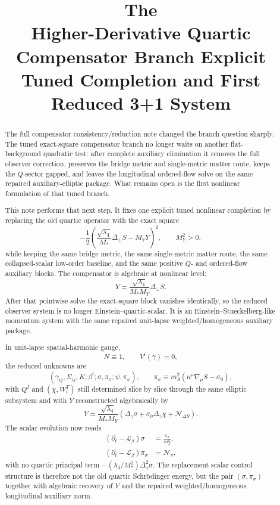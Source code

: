 \documentclass[11pt]{article}
\title{\textbf{The \TheoryName{}}\\[0.4em]
\large Higher-Derivative Quartic Compensator Branch Explicit Tuned Completion and First Reduced 3+1 System}
\author{}
\date{}
\newcommand{\Ell}{\mathcal{L}}
\begin{document}
\maketitle

\begin{abstract}
The full compensator consistency/reduction note changed the branch question sharply. The tuned exact-square compensator branch no longer waits on another flat-background quadratic test: after complete auxiliary elimination it removes the full observer correction, preserves the bridge metric and single-metric matter route, keeps the \(Q\)-sector gapped, and leaves the longitudinal ordered-flow solve on the same repaired auxiliary-elliptic package. What remains open is the first nonlinear formulation of that tuned branch.

This note performs that next step. It fixes one explicit tuned nonlinear completion by replacing the old quartic operator with the exact square
\[
-\frac12
\left(
\frac{\sqrt{\lambda_4}}{M_*}\Delta_\perp S
- M_Y Y
\right)^2,
\qquad
M_Y^2>0,
\]
while keeping the same bridge metric, the same single-metric matter route, the same collapsed-scalar low-order baseline, and the same positive \(Q\)- and ordered-flow auxiliary blocks. The compensator is algebraic at nonlinear level:
\[
Y
=
\frac{\sqrt{\lambda_4}}{M_*M_Y}\Delta_\perp S.
\]
After that pointwise solve the exact-square block vanishes identically, so the reduced observer system is no longer Einstein--quartic-scalar. It is an Einstein--Stueckelberg-like momentum system with the same repaired unit-lapse weighted/homogeneous auxiliary package.

In unit-lapse spatial-harmonic gauge,
\[
N\equiv 1,
\qquad
V^i(\gamma)=0,
\]
the reduced unknowns are
\[
(\gamma_{ij},\Sigma_{ij},K;\beta^i;\sigma,\pi_\sigma;\psi,\pi_\psi),
\qquad
\pi_\sigma \equiv m_S^2(n^\mu\nabla_\mu S-\sigma_0),
\]
with \(Q^I\) and \((\chi,W_i^T)\) still determined slice by slice through the same elliptic subsystem and with \(Y\) reconstructed algebraically by
\[
Y
=
\frac{\sqrt{\lambda_4}}{M_*M_Y}
\left(
\Delta_\gamma\sigma+\sigma_0\Delta_\gamma\chi+\mathcal N_{\Delta S}
\right).
\]
The scalar evolution now reads
\begin{align*}
(\partial_t-\Ell_\beta)\sigma &= \frac{\pi_\sigma}{m_S^2},\\
(\partial_t-\Ell_\beta)\pi_\sigma &= \mathcal N_\pi,
\end{align*}
with no quartic principal term \( -(\lambda_4/M_*^2)\Delta_\gamma^2\sigma\). The replacement scalar control structure is therefore not the old quartic Schr\"odinger energy, but the pair \((\sigma,\pi_\sigma)\) together with algebraic recovery of \(Y\) and the repaired weighted/homogeneous longitudinal auxiliary norm.


\end{abstract}
\end{document}
